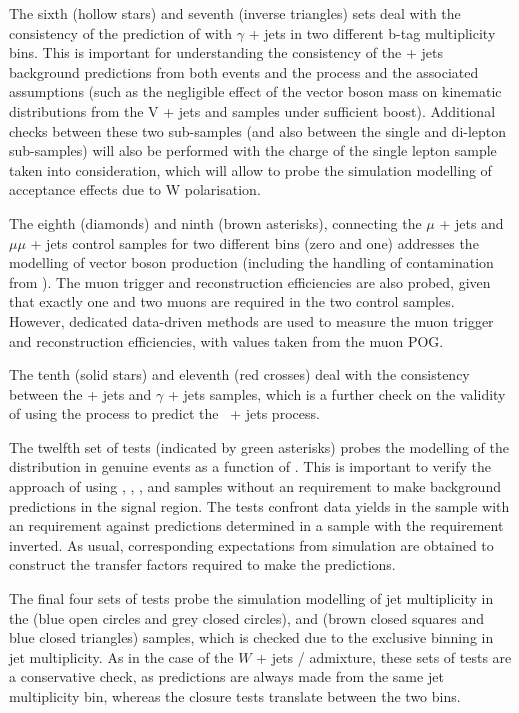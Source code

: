 The sixth (hollow stars) and seventh (inverse triangles) sets deal with
the consistency of the prediction of \wej with $\gamma$ + jets in two
different b-tag multiplicity bins. This is important for understanding
the consistency of the \znunu + jets background predictions from both
\wej events and the \gj process and the associated assumptions (such
as the negligible effect of the vector boson mass on kinematic
distributions from the V + jets and \gj samples under sufficient
boost). Additional checks between these two sub-samples (and also
between the single and di-lepton sub-samples) will also be performed
with the charge of the single lepton sample taken into consideration,
which will allow to probe the simulation modelling of acceptance
effects due to W polarisation.

The eighth (diamonds) and ninth (brown asterisks), connecting the $\mu$
+ jets and $\mu\mu$ + jets control samples for two different \nb bins
(zero and one) addresses the modelling of vector boson production
(including the handling of contamination from \ttbar). The muon
trigger and reconstruction efficiencies are also probed, given that
exactly one and two muons are required in the two control
samples. However, dedicated data-driven methods are used to measure
the muon trigger and reconstruction efficiencies, with values taken
from the muon POG.

The tenth (solid stars) and eleventh (red crosses) deal with the
consistency between the \zee + jets and $\gamma$ + jets
samples, which is a further check on the validity of using the \gj
process to predict the \znunu\, + jets process.

The twelfth set of tests (indicated by green asterisks) probes the
modelling of the \alphat distribution in genuine \met events as a
function of \scalht. This is important to verify the approach of using
\mj, \ej, \mmj, and \eej samples without an \alphat requirement to
make background predictions in the signal region. The tests confront
data yields in the \mj sample with an \alphat requirement against
predictions determined in a \mj sample with the \alphat requirement
inverted. As usual, corresponding expectations from simulation are
obtained to construct the transfer factors required to make the
predictions.

The final four sets of tests probe the simulation modelling of jet
multiplicity in the \ej (blue open circles and grey closed circles),
and \eej (brown closed squares and blue closed triangles) samples,
which is checked due to the exclusive binning in jet multiplicity.  As
in the case of the $W$ + jets / \ttbar admixture, these sets of tests
are a conservative check, as predictions are always made from the same
jet multiplicity bin, whereas the closure tests translate between the
two bins.

